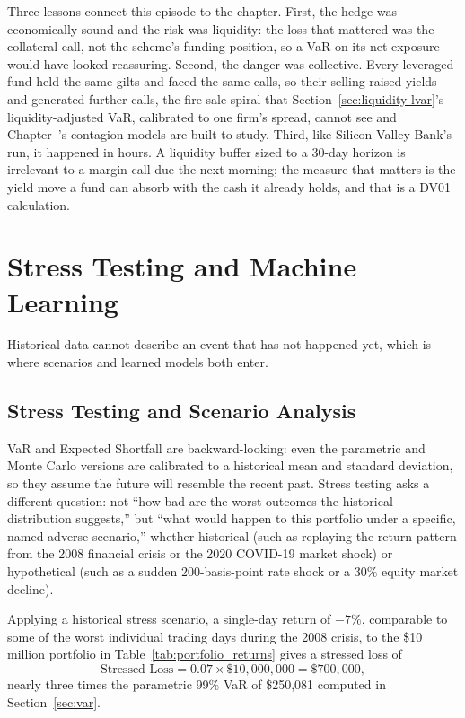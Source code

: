 \documentclass[../ai_in_finance]{subfiles}
\begin{document}
Three lessons connect this episode to the chapter. First, the hedge was economically sound and the risk was liquidity: the loss that mattered was the collateral call, not the scheme's funding position, so a VaR on its net exposure would have looked reassuring. Second, the danger was collective. Every leveraged fund held the same gilts and faced the same calls, so their selling raised yields and generated further calls, the fire-sale spiral that Section~\ref{sec:liquidity-lvar}'s liquidity-adjusted VaR, calibrated to one firm's spread, cannot see and Chapter~'s contagion models are built to study. Third, like Silicon Valley Bank's run, it happened in hours. A liquidity buffer sized to a 30-day horizon is irrelevant to a margin call due the next morning; the measure that matters is the yield move a fund can absorb with the cash it already holds, and that is a DV01 calculation.

\section{Stress Testing and Machine Learning}

Historical data cannot describe an event that has not happened yet, which is where scenarios and learned models both enter.

\subsection{Stress Testing and Scenario Analysis}
\label{sec:stress-testing}

VaR and Expected Shortfall are backward-looking: even the parametric and Monte Carlo versions are calibrated to a historical mean and standard deviation, so they assume the future will resemble the recent past.
Stress testing asks a different question: not ``how bad are the worst outcomes the historical distribution suggests,'' but ``what would happen to this portfolio under a specific, named adverse scenario,'' whether historical (such as replaying the return pattern from the 2008 financial crisis or the 2020 COVID-19 market shock) or hypothetical (such as a sudden 200-basis-point rate shock or a 30\% equity market decline).

Applying a historical stress scenario, a single-day return of $-7\%$, comparable to some of the worst individual trading days during the 2008 crisis, to the \$10 million portfolio in Table~\ref{tab:portfolio_returns} gives a stressed loss of
\begin{equation*}
\text{Stressed Loss} = 0.07 \times \$10{,}000{,}000 = \$700{,}000,
\end{equation*}
nearly three times the parametric 99\% VaR of \$250,081 computed in Section~\ref{sec:var}.
\end{document}
